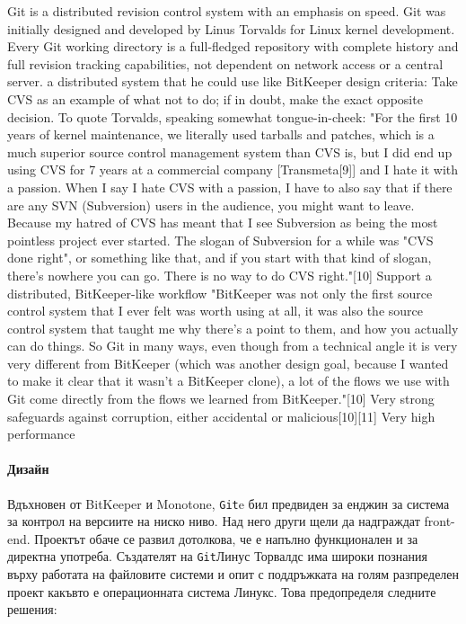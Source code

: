 \documentclass[a4paper]{article}
\def\git{\texttt{Git}}
\begin{document}
    Git is a distributed revision control system with an emphasis on speed. Git was initially designed and developed by Linus Torvalds for Linux kernel development.
    Every Git working directory is a full-fledged repository with complete history and full revision tracking capabilities, not dependent on network access or a central server.
    a distributed system that he could use like BitKeeper
    design criteria:
    Take CVS as an example of what not to do; if in doubt, make the exact opposite decision. To quote Torvalds, speaking somewhat tongue-in-cheek:
    "For the first 10 years of kernel maintenance, we literally used tarballs and patches, which is a much superior source control management system than CVS is, but I did end up using CVS for 7 years at a commercial company [Transmeta[9]] and I hate it with a passion. When I say I hate CVS with a passion, I have to also say that if there are any SVN (Subversion) users in the audience, you might want to leave. Because my hatred of CVS has meant that I see Subversion as being the most pointless project ever started. The slogan of Subversion for a while was "CVS done right", or something like that, and if you start with that kind of slogan, there's nowhere you can go. There is no way to do CVS right."[10]
    Support a distributed, BitKeeper-like workflow
    "BitKeeper was not only the first source control system that I ever felt was worth using at all, it was also the source control system that taught me why there's a point to them, and how you actually can do things. So Git in many ways, even though from a technical angle it is very very different from BitKeeper (which was another design goal, because I wanted to make it clear that it wasn't a BitKeeper clone), a lot of the flows we use with Git come directly from the flows we learned from BitKeeper."[10]
    Very strong safeguards against corruption, either accidental or malicious[10][11]
    Very high performance
  
    \paragraph{Дизайн}

    Вдъхновен от BitKeeper и Monotone, \git e бил предвиден за енджин за система за контрол на версиите на ниско ниво. Над него други щели да надграждат front-end. Проектът обаче се развил дотолкова, че е напълно функционален и за директна употреба. Създателят на \git Линус Торвалдс има широки познания върху работата на файловите системи и опит с поддръжката на голям разпределен проект какъвто е операционната система Линукс. Това предопределя следните решения:
\end{document}
